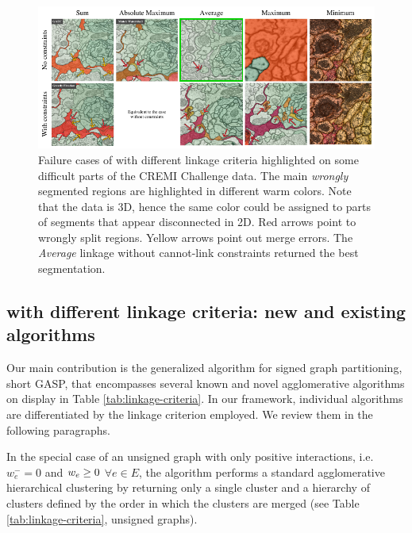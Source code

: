 \begin{figure}
\centering
\includegraphics[width=\textwidth]{./figs/comparison_new.pdf} %
\caption{Failure cases of \algname{} with different linkage criteria highlighted on some difficult parts of the CREMI Challenge data. The main \emph{wrongly} segmented regions are highlighted in different warm colors. Note that the data is 3D, hence the same color could be assigned to parts of segments that appear disconnected in 2D.  Red arrows point to wrongly split regions. Yellow arrows point out merge errors. The \emph{Average} linkage without cannot-link constraints returned the best segmentation.
\label{fig:cremi_comparison}}
\end{figure}



\subsection{\algname{} with different linkage criteria: new and existing algorithms} \label{sec:alg_update_rules}

Our main contribution is the generalized algorithm for signed graph partitioning, short GASP, that encompasses several known and novel agglomerative algorithms on display in Table \ref{tab:linkage-criteria}.
In our framework, individual algorithms are differentiated by the linkage criterion employed. We review them in the following paragraphs.

In the special case of an unsigned graph with only positive interactions, i.e. $w_e^-=0$ and $w_e \geq 0$ $\forall e\in E$, 
 the algorithm performs a standard agglomerative hierarchical clustering by returning only a single cluster and a hierarchy of clusters defined by the order in which the clusters are merged (see Table \ref{tab:linkage-criteria}, unsigned graphs).

